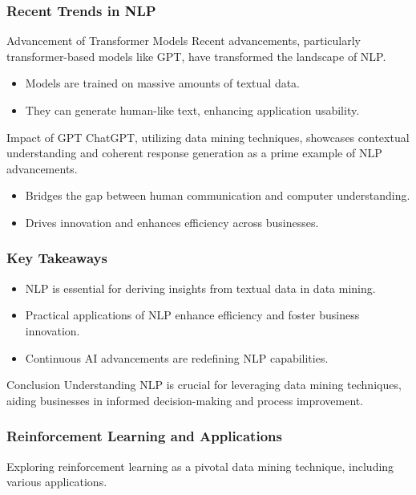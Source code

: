 \documentclass[aspectratio=169]{beamer}
\begin{document}
\begin{frame}[fragile]
    \frametitle{Recent Trends in NLP}
    \begin{block}{Advancement of Transformer Models}
        Recent advancements, particularly transformer-based models like GPT, have transformed the landscape of NLP.
    \end{block}
    \begin{itemize}
        \item Models are trained on massive amounts of textual data.
        \item They can generate human-like text, enhancing application usability.
    \end{itemize}
    \begin{block}{Impact of GPT}
        ChatGPT, utilizing data mining techniques, showcases contextual understanding and coherent response generation as a prime example of NLP advancements.
    \end{block}
    \begin{itemize}
        \item Bridges the gap between human communication and computer understanding.
        \item Drives innovation and enhances efficiency across businesses.
    \end{itemize}
\end{frame}

\begin{frame}[fragile]
    \frametitle{Key Takeaways}
    \begin{itemize}
        \item NLP is essential for deriving insights from textual data in data mining.
        \item Practical applications of NLP enhance efficiency and foster business innovation.
        \item Continuous AI advancements are redefining NLP capabilities.
    \end{itemize}
    \begin{block}{Conclusion}
        Understanding NLP is crucial for leveraging data mining techniques, aiding businesses in informed decision-making and process improvement.
    \end{block}
\end{frame}

\begin{frame}[fragile]
    \frametitle{Reinforcement Learning and Applications}
    Exploring reinforcement learning as a pivotal data mining technique, including various applications.
\end{frame}
\end{document}
